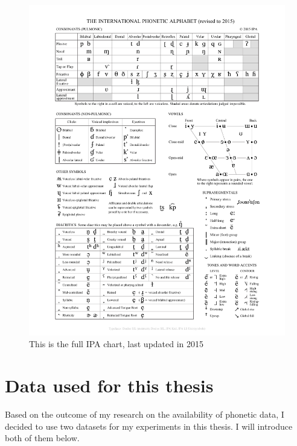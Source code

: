 \begin{figure}[h]
\vspace*{-1.5cm}
    \begin{center}
    \hspace*{-2cm}
      \includegraphics[width=1.3\linewidth]{ipa_chart.pdf}
    \end{center}
    \caption[Full IPA chart]{This is the full IPA chart, last updated in 2015}
    \label{fig:ipa_chart}
  \end{figure}


\section{Data used for this thesis}
\label{sec:dataset}
Based on the outcome of my research on the availability of phonetic data, I decided to use two datasets for my experiments in this thesis. I will introduce both of them below. 

